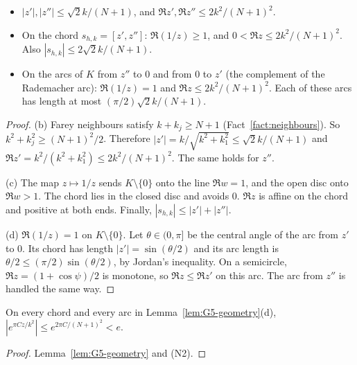 \begin{lemma}[geometry]\label{lem:G5-geometry}
\begin{itemize}
\item[(b)] $|z'|,|z''|\le\sqrt2k/(N+1)$, and $\Re z',\Re z''\le2k^2/(N+1)^2$.
\item[(c)] On the chord $s_{h,k}=[z',z'']$: $\Re(1/z)\ge1$, and $0<\Re z\le 2k^2/(N+1)^2$. Also
$|s_{h,k}|\le2\sqrt2k/(N+1)$.
\item[(d)] On the arcs of $K$ from $z''$ to $0$ and from $0$ to $z'$ (the complement of the Rademacher arc):
$\Re(1/z)=1$ and $\Re z\le2k^2/(N+1)^2$. Each of these arcs has length at most $(\pi/2)\sqrt2k/(N+1)$.
\end{itemize}
\end{lemma}
\begin{proof}
(b) Farey neighbours satisfy $k+k_j\ge N+1$ (Fact~\ref{fact:neighbours}). So $k^2+k_j^2\ge(N+1)^2/2$. Therefore
$|z'|=k/\sqrt{k^2+k_1^2}\le\sqrt2k/(N+1)$ and $\Re z'=k^2/(k^2+k_1^2)\le2k^2/(N+1)^2$. The same holds for $z''$.

(c) The map $z\mapsto1/z$ sends $K\setminus\{0\}$ onto the line $\Re w=1$, and the open disc onto $\Re w>1$. The chord lies
in the closed disc and avoids $0$. $\Re z$ is affine on the chord and positive at both ends. Finally,
$|s_{h,k}|\le|z'|+|z''|$.

(d) $\Re(1/z)=1$ on $K\setminus\{0\}$. Let $\theta\in(0,\pi]$ be the central angle of the arc from $z'$ to $0$. Its chord
has length $|z'|=\sin(\theta/2)$ and its arc length is $\theta/2\le(\pi/2)\sin(\theta/2)$, by Jordan's inequality. On a
semicircle, $\Re z=(1+\cos\psi)/2$ is monotone, so $\Re z\le\Re z'$ on this arc. The arc from $z''$ is handled the same
way.
\end{proof}

\begin{corollary}\label{cor:G5-exp}
On every chord and every arc in Lemma~\ref{lem:G5-geometry}(d), $|e^{\pi Cz/k^2}|\le e^{2\pi C/(N+1)^2}<e$.
\end{corollary}
\begin{proof}
Lemma~\ref{lem:G5-geometry} and (N2).
\end{proof}

